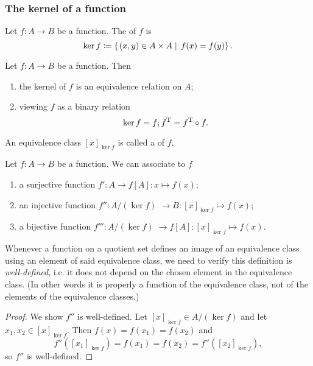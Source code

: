 \subsubsection{The kernel of a function}
\begin{definition}
Let $f:A\to B$ be a function. The  of $f$ is
\[ \ker f \coloneqq \left\{\left. (x,y)\in A\times A \;\right|\; f(x) = f(y) \right\}. \]
\end{definition}

\begin{lemma}
Let $f:A\to B$ be a function. Then
\begin{enumerate}
\item the kernel of $f$ is an equivalence relation on $A$;
\item viewing $f$ as a binary relation
\[ \ker f = f;f^{\mathrm{T}} = f^{\mathrm{T}}\circ f. \]
\end{enumerate}
\end{lemma}

\begin{definition}
An equivalence class $[x]_{\ker f}$ is called a  of $f$.
\end{definition}

\begin{proposition}
Let $f:A\to B$ be a function. We can associate to $f$
\begin{enumerate}
\item a surjective function $f': A\to f[A]: x\mapsto f(x)$;
\item an injective function $f'': A/(\ker f) \;\to B: [x]_{\ker f}\mapsto f(x)$;
\item a bijective function $f''': A/(\ker f) \;\to f[A]: [x]_{\ker f}\mapsto f(x)$.
\end{enumerate}
\end{proposition}
Whenever a function on a quotient set defines an image of an equivalence class using an element of said equivalence class, we need to verify this definition is \emph{well-defined}, i.e. it does not depend on the chosen element in the equivalence class. (In other words it is properly a function of the equivalence class, not of the elements of the equivalence classes.)
\begin{proof}
We show $f''$ is well-defined. Let $[x]_{\ker f}\in A/(\ker f)$ and let $x_1,x_2\in [x]_{\ker f}$. Then $f(x) = f(x_1) = f(x_2)$ and
\[ f''([x_1]_{\ker f}) = f(x_1) = f(x_2) = f''([x_2]_{\ker f}), \]
so $f''$ is well-defined.
\end{proof}

